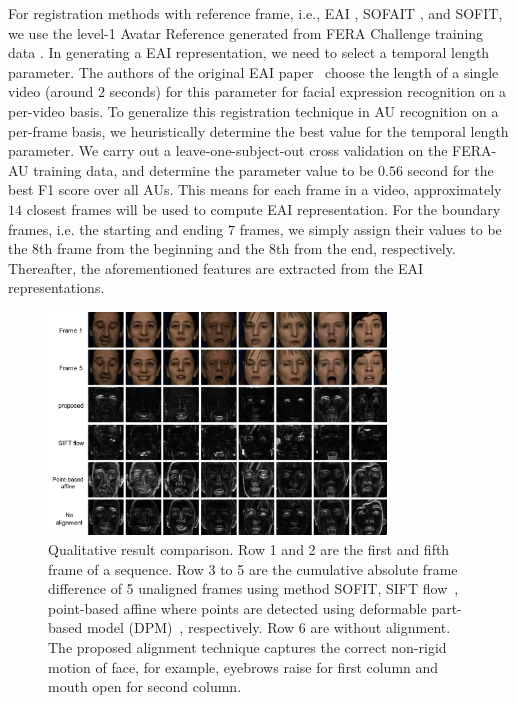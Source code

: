 \documentclass[10pt,journal]{IEEEtran}
\begin{document}
For registration methods with reference frame, i.e., EAI \cite{Yang_SMCB12}, SOFAIT \cite{Yang_FG13}, and SOFIT, we use the level-1 Avatar Reference \cite{Yang_SMCB12} generated from FERA Challenge training data \cite{FERA11}. In generating a EAI representation, we need to select a temporal length parameter. The authors of the original EAI paper~\cite{Yang_SMCB12} choose the length of a single video (around $2$ seconds) for this parameter for facial expression recognition on a per-video basis. To generalize this registration technique in AU recognition on a per-frame basis, we heuristically determine the best value for the temporal length parameter. We carry out a leave-one-subject-out cross validation on the FERA-AU training data, and determine the parameter value to be $0.56$ second for the best F1 score over all AUs. This means for each frame in a video, approximately $14$ closest frames will be used to compute EAI representation. For the boundary frames, i.e. the starting and ending $7$ frames, we simply assign their values to be the $8$th frame from the beginning and the $8$th from the end, respectively. Thereafter, the aforementioned features are extracted from the EAI representations.

\begin{figure}[t]
	\centering
		\includegraphics[width=0.8\textwidth]{fig/fera_diff.png}
	\caption{Qualitative result comparison. Row 1 and 2 are the first and fifth frame of a sequence. Row 3 to 5 are the cumulative absolute frame difference of 5 unaligned frames using method SOFIT, SIFT flow~\cite{Liu_PAMI11}, point-based affine where points are detected using deformable part-based model (DPM)~\cite{Zhu_CVPR12}, respectively. Row 6 are without alignment. The proposed alignment technique captures the correct non-rigid motion of face, for example, eyebrows raise for first column and mouth open for second column.}
	\label{fig:fera_diff}
\end{figure}
\end{document}
